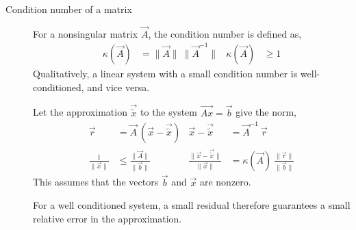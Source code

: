 \begin{description}
    \item[Condition number of a matrix] For a nonsingular matrix $ \vec{A} $, the
        condition number is defined as,
        \begin{align}
            \kappa(\vec{A}) & = \lVert \vec{A} \rVert\ \lVert \vec{A}^{-1} \rVert &
            \kappa(\vec{A}) & \geq 1
        \end{align}
        Qualitatively, a linear system with a small condition number is well-conditioned,
        and vice versa. \par
        Let the approximation $ \vec{\tilde{x}} $ to the system $ \vec{Ax} = \vec{b} $
        give the norm,
        \begin{align}
            \vec{r}                         & = \vec{A}\ (\vec{x} - \vec{\tilde{x}}) &
            \vec{x} - \vec{\tilde{x}}       & = \vec{A}^{-1}\ \vec{r}                  \\
            \frac{1}{\lVert \vec{x} \rVert} & \leq \frac{\lVert \vec{A} \rVert}
            {\lVert \vec{b} \rVert}         &
            \frac{\lVert \vec{x} - \vec{\tilde{x}} \rVert}
            {\lVert \vec{x} \rVert}         & = \kappa(\vec{A})
            \ \frac{\lVert \vec{r} \rVert}{\lVert \vec{b} \rVert}
        \end{align}
        This assumes that the vectors $ \vec{b} $ and $ \vec{x} $ are nonzero. \par
        For a well conditioned system, a small residual therefore guarantees a small
        relative error in the approximation.


\end{description}

